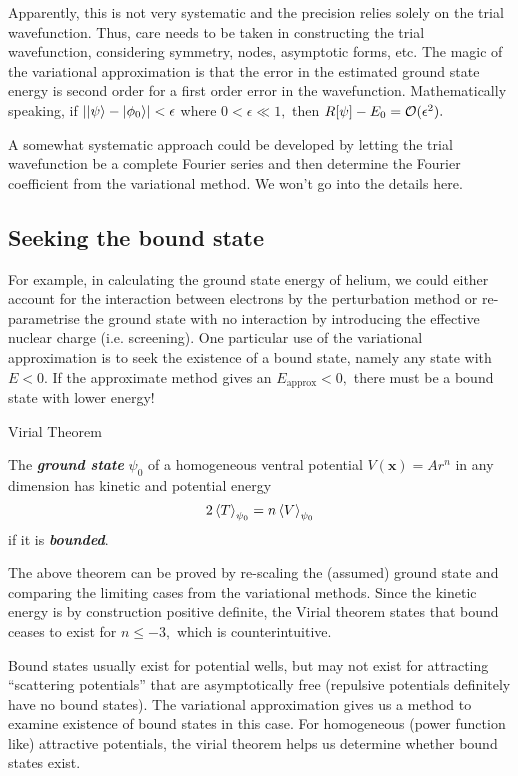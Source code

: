 \documentclass{article}
\theoremstyle{nonumberplain}
\begin{document}
Apparently, this is not very systematic and the precision relies solely on the trial wavefunction. Thus, care needs to be taken in constructing the trial wavefunction, considering symmetry, nodes, asymptotic forms, etc. The magic of the variational approximation is that the error in the estimated ground state energy is second order for a first order error in the wavefunction. Mathematically speaking, if \(
    \left\vert \ket{\psi} - \ket{\phi_0} \right\vert < \epsilon
\) where $0 < \epsilon  \ll 1,$ then $R[\psi] - E_0 = \mathcal{\MakeUppercase{O}} (\epsilon ^{2} ). $

A somewhat systematic approach could be developed by letting the trial wavefunction be a complete Fourier series and then determine the Fourier coefficient from the variational method. We won't go into the details here. 

\subsection{Seeking the bound state}
For example, in calculating the ground state energy of helium, we could either account for the interaction between electrons by the perturbation method or re-parametrise the ground state with no interaction by introducing the effective nuclear charge (i.e. screening). One particular use of the variational approximation is to seek the existence of a bound state, namely any state with $E<0.$ If the approximate method gives an $E_{\mathrm{approx} } <0,$ there must be a bound state with lower energy! 

\begin{frm-thm}{Virial Theorem}

    The \textit{\textbf{ground state}} $\psi_0$ of a homogeneous ventral potential $V(\mathbf{x}) = Ar^n$ in any dimension has kinetic and potential energy
    \[
        2 \expval{T}_{\psi_0} = n \expval{V}_{\psi_0}
    \]
    if it is \textit{\textbf{bounded}}. 
\end{frm-thm}

The above theorem can be proved by re-scaling the (assumed) ground state and comparing the limiting cases from the variational methods. Since the kinetic energy is by construction positive definite, the Virial theorem states that bound ceases to exist for $n \leq  -3,$ which is counterintuitive. 

Bound states usually exist for potential wells, but may not exist for attracting ``scattering potentials'' that are asymptotically free (repulsive potentials definitely have no bound states). The variational approximation gives us a method to examine existence of bound states in this case. For homogeneous (power function like) attractive potentials, the virial theorem helps us determine whether bound states exist. 
\end{document}
